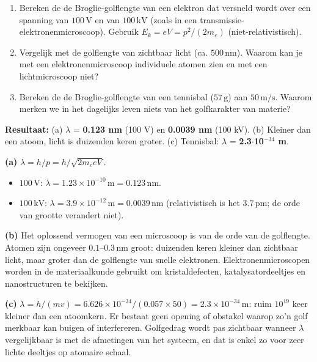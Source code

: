 \begin{oefening}
\begin{enumerate}
\item[(a)]
  Bereken de de Broglie-golflengte van een elektron dat versneld wordt over een spanning van \(100\,\mathrm{V}\) en van \(100\,\mathrm{kV}\) (zoals in een transmissie-elektronenmicroscoop). Gebruik \(E_k = eV = p^2/(2m_e)\) (niet-relativistisch).
\item[(b)]
  Vergelijk met de golflengte van zichtbaar licht (ca. \(500\,\mathrm{nm}\)). Waarom kan je met een elektronenmicroscoop individuele atomen zien en met een lichtmicroscoop niet?
\item[(c)]
  Bereken de de Broglie-golflengte van een tennisbal (\(57\,\mathrm{g}\)) aan \(50\,\mathrm{m/s}\). Waarom merken we in het dagelijks leven niets van het golfkarakter van materie?
\end{enumerate}
\end{oefening}
\begin{oplossing}
\textbf{Resultaat:} (a) \(\lambda\) = \textbf{0.123 nm} (100 V) en \textbf{0.0039 nm} (100 kV). (b) Kleiner dan een atoom, licht is duizenden keren groter. (c) Tennisbal: \(\lambda\) = \textbf{2.3\ensuremath{\cdot{}}10\ensuremath{^{-34}} m}.

\textbf{(a)} \(\lambda = h/p = h/\sqrt{2m_e eV}\).

\begin{itemize}
\item
  \(100\,\mathrm{V}\): \(\lambda = 1.23\times10^{-10}\,\mathrm{m} = 0.123\,\mathrm{nm}\).
\item
  \(100\,\mathrm{kV}\): \(\lambda = 3.9\times10^{-12}\,\mathrm{m} = 0.0039\,\mathrm{nm}\) (relativistisch is het \(3.7\,\mathrm{pm}\); de orde van grootte verandert niet).
\end{itemize}

\textbf{(b)} Het oplossend vermogen van een microscoop is van de orde van de golflengte. Atomen zijn ongeveer \(0.1\)--\(0.3\,\mathrm{nm}\) groot: duizenden keren kleiner dan zichtbaar licht, maar groter dan de golflengte van snelle elektronen. Elektronenmicroscopen worden in de materiaalkunde gebruikt om kristaldefecten, katalysatordeeltjes en nanostructuren te bekijken.

\textbf{(c)} \(\lambda = h/(mv) = 6.626\times10^{-34}/(0.057 \times 50) = 2.3\times10^{-34}\,\mathrm{m}\): ruim \(10^{19}\) keer kleiner dan een atoomkern. Er bestaat geen opening of obstakel waarop zo'n golf merkbaar kan buigen of interfereren. Golfgedrag wordt pas zichtbaar wanneer \(\lambda\) vergelijkbaar is met de afmetingen van het systeem, en dat is enkel zo voor zeer lichte deeltjes op atomaire schaal.
\end{oplossing}

